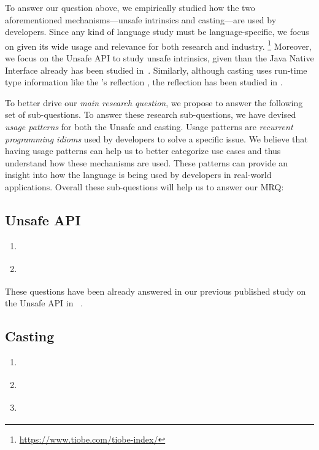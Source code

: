 To answer our question above,
we empirically studied how the two aforementioned mechanisms---unsafe intrinsics and casting---are used by developers.
Since any kind of language study must be language-specific,
we focus on \java{} given its wide usage and relevance for both
research and industry.%
\footnote{\url{https://www.tiobe.com/tiobe-index/}}
Moreover, we focus on the \java{} Unsafe API to study unsafe intrinsics,
given than the Java Native Interface already has been studied
in~\cite{tanSafeJavaNative2006,tanEmpiricalSecurityStudy2008,kondohFindingBugsJava2008,sunNativeGuardProtectingAndroid2014,liFindingBugsExceptional2009}.
Similarly, although casting uses run-time type information like
the \java's reflection \api{},
the reflection \api{} has been studied in
\cite{livshitsImprovingSoftwareSecurity2006,livshitsReflectionAnalysisJava2005,landmanChallengesStaticAnalysis2017}.

To better drive our \emph{main research question},
we propose to answer the following set of sub-questions.
To answer these research sub-questions,
we have devised \emph{usage patterns} for both the Unsafe \api{} and casting.
Usage patterns are \emph{recurrent programming idioms} used by developers to solve a specific issue.
We believe that having usage patterns can help us to better categorize use cases and
thus understand how these mechanisms are used.
These patterns can provide an insight into how the language is being used by developers in real-world applications.
Overall these sub-questions will help us to answer our MRQ:

\subsection*{Unsafe API}

\begin{enumerate}[label=$RQ/U\arabic*:$,leftmargin=3.4\parindent]
\item {\bf \urqA} \urqAdesc{}
\item {\bf \urqB} \urqBdesc{}
\end{enumerate}

These questions have been already answered in our previous published
study on the Unsafe API in \java{}~\citep{mastrangeloUseYourOwn2015}.

\subsection*{Casting}

\begin{enumerate}[label=$RQ/C\arabic*:$,leftmargin=3.4\parindent]
\item {\bf \crqA} \crqAdesc{}
\item {\bf \crqB} \crqBdesc{}
\item {\bf \crqC} \crqCdesc{}
\end{enumerate}

